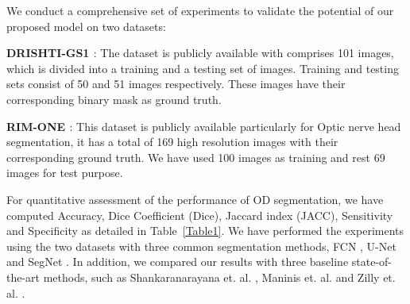 \documentclass{IOS-Book-Article}
\begin{document}
We conduct a comprehensive set of experiments to validate the
potential of our proposed model on two datasets:

\textbf{DRISHTI-GS1 \cite{sivaswamy2015comprehensive}}: The dataset is publicly available with comprises 101 images, which is divided into a training and a testing set of images. Training and testing sets consist of 50 and 51 images respectively. These images have their corresponding binary mask as ground truth.

\textbf{RIM-ONE \cite{fumero2011rim}}: This dataset is publicly available particularly for Optic nerve head segmentation, it has a total of 169 high resolution images with their corresponding ground truth. We have used 100 images as training and rest 69 images for test purpose.

For quantitative assessment of the performance of OD segmentation, we have computed Accuracy, Dice Coefficient (Dice), Jaccard index (JACC), Sensitivity and Specificity as detailed in Table~\ref{Table1}. We have performed the experiments using the two datasets with three common segmentation methods, FCN \cite{long2015fully}, U-Net\cite{ronneberger2015u} and SegNet \cite{badrinarayanan2017segnet}. In addition, we compared our results with three baseline state-of-the-art methods, such as Shankaranarayana  et. al. \cite{shankaranarayana2017joint}, Maninis et. al. \cite{maninis2016deep} and Zilly et. al. \cite{zilly2015boosting}. %
\end{document}
